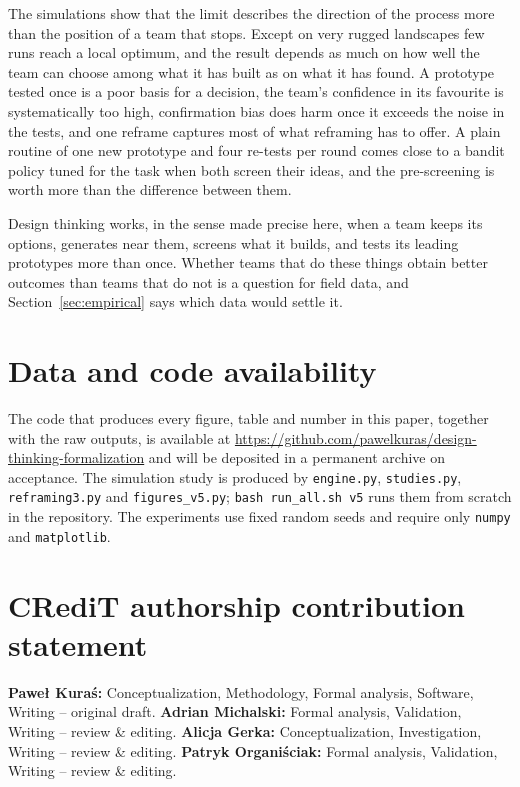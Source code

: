 \documentclass[10pt,twocolumn]{article}
\theoremstyle{definition}
\begin{document}
The simulations show that the limit describes the direction of the process more than the position of a team that stops. Except on very rugged landscapes few runs reach a local optimum, and the result depends as much on how well the team can choose among what it has built as on what it has found. A prototype tested once is a poor basis for a decision, the team's confidence in its favourite is systematically too high, confirmation bias does harm once it exceeds the noise in the tests, and one reframe captures most of what reframing has to offer. A plain routine of one new prototype and four re-tests per round comes close to a bandit policy tuned for the task when both screen their ideas, and the pre-screening is worth more than the difference between them.

Design thinking works, in the sense made precise here, when a team keeps its options, generates near them, screens what it builds, and tests its leading prototypes more than once. Whether teams that do these things obtain better outcomes than teams that do not is a question for field data, and Section~\ref{sec:empirical} says which data would settle it.

\section*{Data and code availability}
The code that produces every figure, table and number in this paper, together with the raw outputs, is available at \url{https://github.com/pawelkuras/design-thinking-formalization} and will be deposited in a permanent archive on acceptance. The simulation study is produced by \texttt{engine.py}, \texttt{studies.py}, \texttt{reframing3.py} and \texttt{figures\_v5.py}; \texttt{bash run\_all.sh v5} runs them from scratch in the repository. The experiments use fixed random seeds and require only \texttt{numpy} and \texttt{matplotlib}.

\section*{CRediT authorship contribution statement}
\textbf{Pawe\l{} Kura\'s:} Conceptualization, Methodology, Formal analysis, Software, Writing -- original draft. \textbf{Adrian Michalski:} Formal analysis, Validation, Writing -- review \& editing. \textbf{Alicja Gerka:} Conceptualization, Investigation, Writing -- review \& editing. \textbf{Patryk Organi\'sciak:} Formal analysis, Validation, Writing -- review \& editing.
\end{document}
